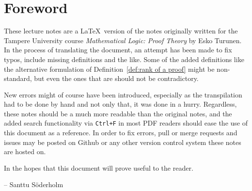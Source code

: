 \section*{Foreword}

These lecture notes are a \LaTeX\ version of the notes originally
written for the Tampere University course \emph{Mathematical Logic: Proof Theory}
by Esko Turunen. In the process of translating the document, an attempt has been
made to fix typos, include missing definitions and the like. Some of the added
definitions like the alternative formulation of Definition~\ref{def:rank of a proof}
might be non-standard, but even the ones that are should not be contradictory.

New errors might of course have been introduced, especially as the transpilation had to
be done by hand and not only that, it was done in a hurry.
Regardless, these notes should be a much more readable than the original notes,
and the added search functionality via \texttt{Ctrl+F} in most PDF readers
should ease the use of this document as a reference. In order to fix errors,
pull or merge requests and issues may be posted on Github or any other version
control system these notes are hosted on.

In the hopes that this document will prove useful to the reader.

-- Santtu Söderholm

\pagebreak
